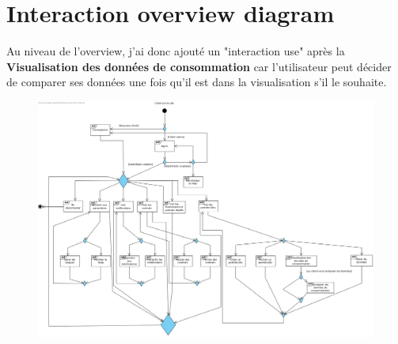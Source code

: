 \section{Interaction overview diagram}

\begin{flushleft}
Au niveau de l'overview, j'ai donc ajouté un "interaction use" après la \textbf{Visualisation des données de consommation} car l'utilisateur peut décider de comparer ses données une fois qu'il est dans la visualisation s'il le souhaite.
\end{flushleft}

\begin{figure}[h]
\centering
\includegraphics[width=1.3\textwidth]{extension-adrien/Overview/img/overview.png}
\end{figure}
